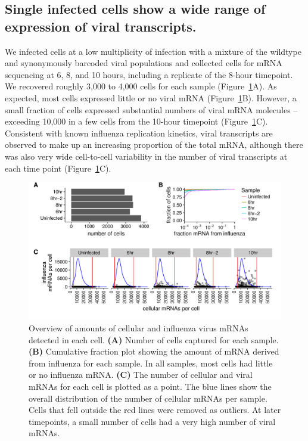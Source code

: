 \documentclass[9pt,lineno]{elife}
\begin{document}
\subsection{Single infected cells show a wide range of expression of viral transcripts.}
We infected cells at a low multiplicity of infection with a mixture of the wildtype and synonymously barcoded viral populations and collected cells for mRNA sequencing at 6, 8, and 10 hours, including a replicate of the 8-hour timepoint.
We recovered roughly 3,000 to 4,000 cells for each sample (Figure~\ref{fig:cells}A). 
As expected, most cells expressed little or no viral mRNA (Figure~\ref{fig:cells}B).
However, a small fraction of cells expressed substantial numbers of viral mRNA molecules -- exceeding 10,000 in a few cells from the 10-hour timepoint (Figure~\ref{fig:cells}C). 
Consistent with known influenza replication kinetics, viral transcripts are observed to make up an increasing proportion of the total mRNA, although there was also very wide cell-to-cell variability in the number of viral transcripts at each time point (Figure~\ref{fig:cells}C).

\begin{figure}
\includegraphics[width=\linewidth]{figures/p_cell_mRNA_summary.pdf}
\caption{\label{fig:cells}
Overview of amounts of cellular and influenza virus mRNAs detected in each cell.
{\bf (A)} 
Number of cells captured for each sample.
{\bf (B)} 
Cumulative fraction plot showing the amount of mRNA derived from influenza for each sample.
In all samples, most cells had little or no influenza mRNA.
{\bf (C)} 
The number of cellular and viral mRNAs for each cell is plotted as a point.
The blue lines show the overall distribution of the number of cellular mRNAs per sample.
Cells that fell outside the red lines were removed as outliers.
At later timepoints, a small number of cells had a very high number of viral mRNAs.
}
\end{figure}
\end{document}
